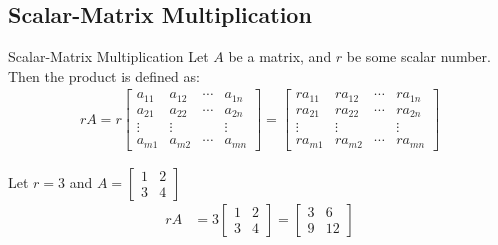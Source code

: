 \documentclass[\main/notes.tex]{subfiles}
\begin{document}
			\subsection{Scalar-Matrix Multiplication}
				\begin{definition}[width=0.7\textwidth]{Scalar-Matrix Multiplication}
					Let $A$ be a matrix, and $r$ be some scalar number.\\
					Then the product  is defined as:
					\begin{align*}
						rA = r \begin{bmatrix}
							a_{11} & a_{12} & \cdots & a_{1n}\\
							a_{21} & a_{22} & \cdots & a_{2n}\\
							\vdots & \vdots & & \vdots\\
							a_{m1} & a_{m2} & \cdots & a_{mn}
						\end{bmatrix}
						= \begin{bmatrix}
							ra_{11} & ra_{12} & \cdots & ra_{1n}\\
							ra_{21} & ra_{22} & \cdots & ra_{2n}\\
							\vdots & \vdots & & \vdots\\
							ra_{m1} & ra_{m2} & \cdots & ra_{mn}
						\end{bmatrix}
					\end{align*}
				\end{definition}
				\begin{example}[width=0.42\textwidth]
					Let $r = 3$ and $A = \begin{bmatrix}
						1 & 2\\
						3 & 4
					\end{bmatrix}$
					\begin{align*}
						rA &= 3\begin{bmatrix}
							1 & 2\\
							3 & 4
						\end{bmatrix}
						= \begin{bmatrix}
							3 & 6\\
							9 & 12
						\end{bmatrix}
					\end{align*}
				\end{example}
\end{document}
